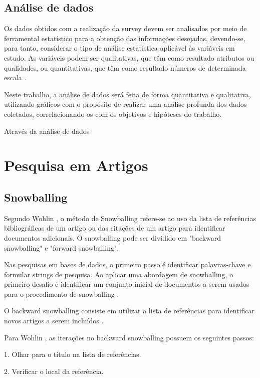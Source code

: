 \subsection{Análise de dados}

Os dados obtidos com a realização da survey devem ser analisados por meio de ferramental estatístico para a obtenção das informações desejadas, devendo-se, para tanto, considerar o tipo de análise estatística aplicável às variáveis em estudo. As variáveis podem ser qualitativas, que têm como resultado atributos ou qualidades, ou quantitativas, que têm como resultado números de determinada escala \cite{freitas2000metodo}.

Neste trabalho, a análise de dados será feita de forma quantitativa e qualitativa, utilizando gráficos com o propósito de realizar uma análise profunda dos dados coletados, correlacionando-os com os objetivos e hipóteses do trabalho. 

Através da análise de dados

\section{Pesquisa em Artigos}

\subsection{Snowballing}

Segundo Wohlin \cite{wohlin2014guidelines}, o método de Snowballing refere-se ao uso da lista de referências bibliográficas de um artigo ou das citações de um artigo para identificar documentos adicionais. O snowballing pode ser dividido em "backward snowballing" e "forward snowballing".

Nas pesquisas em bases de dados, o primeiro passo é identificar palavras-chave e formular strings de pesquisa. Ao aplicar uma abordagem de snowballing, o primeiro desafio é identificar um conjunto inicial de documentos a serem usados para o procedimento de snowballing \cite{wohlin2014guidelines}.

O backward snowballing consiste em utilizar a lista de referências para identificar novos artigos a serem incluídos \cite{wohlin2014guidelines}.

Para Wohlin \cite{wohlin2014guidelines}, as iterações no backward snowballing possuem os seguintes passos:

1. Olhar para o título na lista de referências.

2. Verificar o local da referência.


